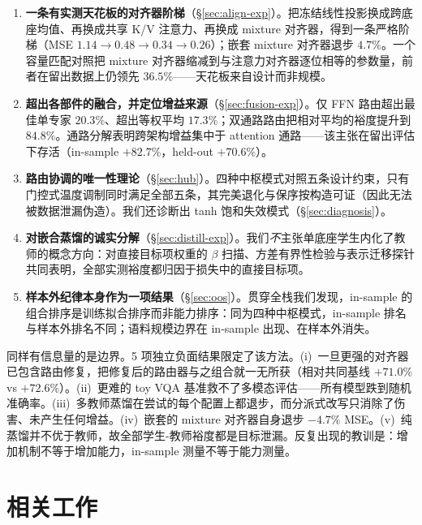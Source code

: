 \documentclass[10pt,twoside]{article}
\theoremstyle{definition}
\theoremstyle{plain}
\theoremstyle{remark}
\begin{document}
\begin{enumerate}[leftmargin=1.5em, itemsep=1pt]
    \item \textbf{一条有实测天花板的对齐器阶梯}（\S\ref{sec:align-exp}）。把冻结线性投影换成跨底座均值、再换成共享 K/V 注意力、再换成 mixture 对齐器，得到一条严格阶梯（MSE $1.14 \rightarrow 0.48 \rightarrow 0.34 \rightarrow 0.26$）；嵌套 mixture 对齐器退步 $4.7\%$。一个容量匹配对照把 mixture 对齐器缩减到与注意力对齐器逐位相等的参数量，前者在留出数据上仍领先 $36.5\%$——天花板来自设计而非规模。
    \item \textbf{超出各部件的融合，并定位增益来源}（\S\ref{sec:fusion-exp}）。仅 FFN 路由超出最佳单专家 $20.3\%$、超出等权平均 $17.3\%$；双通路路由把相对平均的裕度提升到 $84.8\%$。通路分解表明跨架构增益集中于 attention 通路——该主张在留出评估下存活（in-sample $+82.7\%$，held-out $+70.6\%$）。
    \item \textbf{路由协调的唯一性理论}（\S\ref{sec:hub}）。四种中枢模式对照五条设计约束，只有门控式温度调制同时满足全部五条，其完美退化与保序按构造可证（因此无法被数据泄漏伪造）。我们还诊断出 tanh 饱和失效模式（\S\ref{sec:diagnosis}）。
    \item \textbf{对嵌合蒸馏的诚实分解}（\S\ref{sec:distill-exp}）。我们\emph{不}主张单底座学生内化了教师的概念方向：对直接目标项权重的 $\beta$ 扫描、方差有界性检验与表示迁移探针共同表明，全部实测裕度都归因于损失中的直接目标项。
    \item \textbf{样本外纪律本身作为一项结果}（\S\ref{sec:oos}）。贯穿全栈我们发现，in-sample 的组合排序是训练拟合排序而非能力排序：同为四种中枢模式，in-sample 排名与样本外排名不同；语料规模边界在 in-sample 出现、在样本外消失。
\end{enumerate}

同样有信息量的是边界。5 项独立负面结果限定了该方法。(i)~一旦更强的对齐器已包含路由修复，把修复后的路由器与之组合就一无所获（相对共同基线 $+71.0\%$ vs $+72.6\%$）。(ii)~更难的 toy VQA 基准救不了多模态评估——所有模型跌到随机准确率。(iii)~多教师蒸馏在尝试的每个配置上都退步，而分派式改写只消除了伤害、未产生任何增益。(iv)~嵌套的 mixture 对齐器自身退步 $-4.7\%$ MSE。(v)~纯蒸馏并不优于教师，故全部学生-教师裕度都是目标泄漏。反复出现的教训是：增加机制不等于增加能力，in-sample 测量不等于能力测量。

\section{相关工作}
\label{sec:related}
\end{document}

